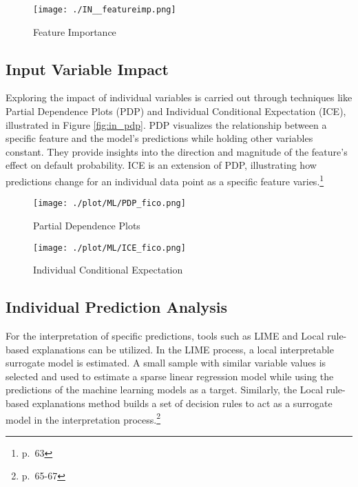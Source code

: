 \begin{figure}[H]
	\centering
	\texttt{[image: ./IN\_\_featureimp.png]}
    \caption{Feature Importance}
    \label{fig:in_featureimp}
\end{figure}

\subsection{Input Variable Impact}
Exploring the impact of individual variables is carried out through techniques like Partial Dependence Plots (PDP) and Individual Conditional Expectation (ICE), illustrated in Figure \ref{fig:in_pdp}. PDP visualizes the relationship between a specific feature and the model's predictions while holding other variables constant. They provide insights into the direction and magnitude of the feature's effect on default probability. ICE is an extension of PDP, illustrating how predictions change for an individual data point as a specific feature varies.\footnote{\cite{Roberts2022} p.~63}

\begin{figure}[H]
\begin{minipage}{.5\textwidth}
	\centering
	\texttt{[image: ./plot/ML/PDP\_fico.png]}
    \caption{Partial Dependence Plots}
    \label{fig:in_pdp}
\end{minipage}%
\begin{minipage}{.5\textwidth}
	\centering
	\texttt{[image: ./plot/ML/ICE\_fico.png]}
    \caption{Individual Conditional Expectation}
    \label{fig:in_ice}
\end{minipage}
\end{figure}

\newpage
\subsection{Individual Prediction Analysis}
For the interpretation of specific predictions, tools such as \ac{LIME} and Local rule-based explanations can be utilized. In the \ac{LIME} process, a local interpretable surrogate model is estimated. A small sample with similar variable values is selected and used to estimate a sparse linear regression model while using the predictions of the machine learning models as a target. Similarly, the Local rule-based explanations method builds a set of decision rules to act as a surrogate model in the interpretation process.\footnote{\cite{Roberts2022} p.~65-67}


